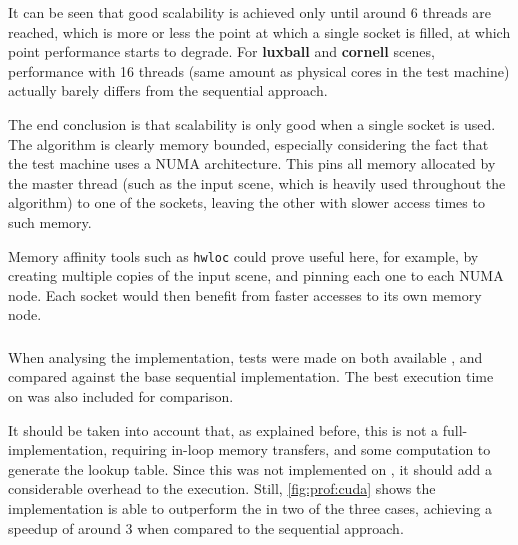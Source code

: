 \documentclass[main.tex]{subfiles}
\begin{document}
It can be seen that good scalability is achieved only until around 6 threads are reached, which is more or less the point at which a single \cpu socket is filled, at which point performance starts to degrade.
For \textbf{luxball} and \textbf{cornell} scenes, performance with 16 threads (same amount as physical \cpu cores in the test machine) actually barely differs from the sequential approach.

The end conclusion is that scalability is only good when a single socket is used. The algorithm is clearly memory bounded, especially considering the fact that the test machine uses a \acs{NUMA} architecture. This pins all memory allocated by the master thread (such as the input scene, which is heavily used throughout the algorithm) to one of the sockets, leaving the other with slower access times to such memory.

Memory affinity tools such as \texttt{hwloc} could prove useful here, for example, by creating multiple copies of the input scene, and pinning each one to each \acs{NUMA} node. Each socket would then benefit from faster accesses to its own memory node.

\subsubsection{\cuda}

When analysing the \gpu implementation, tests were made on both available \gpus, and compared against the base sequential \cpu implementation. The best execution time on \cpu was also included for comparison.

It should be taken into account that, as explained before, this is not a full-\gpu implementation, requiring in-loop memory transfers, and some \cpu computation to generate the lookup table. Since this was not implemented on \gpu, it should add a considerable overhead to the execution. Still, \cref{fig:prof:cuda} shows the implementation is able to outperform the \cpu in two of the three cases, achieving a speedup of around 3 when compared to the sequential approach.
\end{document}
